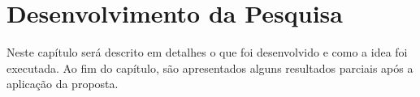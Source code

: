 
\chapter{Desenvolvimento da Pesquisa}
    \label{cha:desenvolvimento-da-pesquisa}
    
    Neste capítulo será descrito em detalhes o que foi desenvolvido e como a idea foi executada. Ao fim do capítulo, são apresentados alguns resultados parciais após a aplicação da proposta.

    
    
    
    
    
    
    
    
